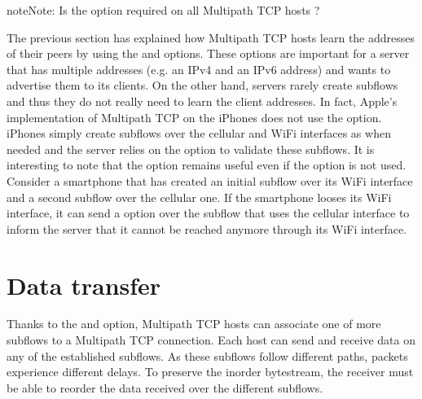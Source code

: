 \documentclass[letterpaper,10pt,english]{sphinxmanual}
\begin{document}
\begin{sphinxadmonition}{note}{Note:}
\sphinxAtStartPar
Is the  option required on all Multipath TCP hosts ?

\sphinxAtStartPar
The previous section has explained how Multipath TCP hosts learn the addresses of their peers by using the  and  options. These options are important for a server that has multiple addresses (e.g. an IPv4 and an IPv6 address) and wants to advertise them to its clients. On the other hand, servers rarely create subflows and thus they do not really need to learn the client addresses. In fact, Apple’s implementation of Multipath TCP on the iPhones does not use the  option. iPhones simply create subflows over the cellular and Wi\sphinxhyphen{}Fi interfaces as when needed and the server relies on the  option to validate these subflows. It is interesting to note that the  option remains useful even if the  option is not used. Consider a smartphone that has created an initial subflow over its Wi\sphinxhyphen{}Fi interface and a second subflow over the cellular one. If the smartphone looses its Wi\sphinxhyphen{}Fi interface, it can send a  option over the subflow that uses the cellular interface to inform the server that it cannot be reached anymore through its Wi\sphinxhyphen{}Fi interface.
\end{sphinxadmonition}


\section{Data transfer}
\label{\detokenize{mptcp:data-transfer}}\label{\detokenize{mptcp:mptcp-data-transfer}}
\sphinxAtStartPar
Thanks to the  and  option, Multipath TCP hosts can associate one of more subflows to a Multipath TCP connection. Each host can send and receive data on any of the established subflows. As these subflows follow different paths, packets experience different delays. To preserve the in\sphinxhyphen{}order bytestream, the receiver must be able to reorder the data received over the different subflows.
\end{document}
